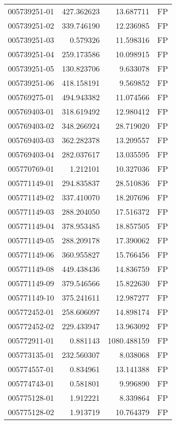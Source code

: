 \begin{tabular}{lrrl}
005739251-01 &  427.362623 &    13.687711 &   FP \\
005739251-02 &  339.746190 &    12.236985 &   FP \\
005739251-03 &    0.579326 &    11.598316 &   FP \\
005739251-04 &  259.173586 &    10.098915 &   FP \\
005739251-05 &  130.823706 &     9.633078 &   FP \\
005739251-06 &  418.158191 &     9.569852 &   FP \\
005769275-01 &  494.943382 &    11.074566 &   FP \\
005769403-01 &  318.619492 &    12.980412 &   FP \\
005769403-02 &  348.266924 &    28.719020 &   FP \\
005769403-03 &  362.282378 &    13.209557 &   FP \\
005769403-04 &  282.037617 &    13.035595 &   FP \\
005770769-01 &    1.212101 &    10.327036 &   FP \\
005771149-01 &  294.835837 &    28.510836 &   FP \\
005771149-02 &  337.410070 &    18.207696 &   FP \\
005771149-03 &  288.204050 &    17.516372 &   FP \\
005771149-04 &  378.953485 &    18.857505 &   FP \\
005771149-05 &  288.209178 &    17.390062 &   FP \\
005771149-06 &  360.955827 &    15.766456 &   FP \\
005771149-08 &  449.438436 &    14.836759 &   FP \\
005771149-09 &  379.546566 &    15.822630 &   FP \\
005771149-10 &  375.241611 &    12.987277 &   FP \\
005772452-01 &  258.606097 &    14.898174 &   FP \\
005772452-02 &  229.433947 &    13.963092 &   FP \\
005772911-01 &    0.881143 &  1080.488159 &   FP \\
005773135-01 &  232.560307 &     8.038068 &   FP \\
005774557-01 &    0.834961 &    13.141388 &   FP \\
005774743-01 &    0.581801 &     9.996890 &   FP \\
005775128-01 &    1.912221 &     8.339864 &   FP \\
005775128-02 &    1.913719 &    10.764379 &   FP \\

\end{tabular}

